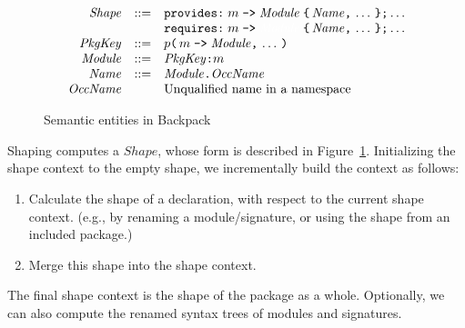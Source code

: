 \documentclass{article}
\newcommand{\I}[1]{\ensuremath{\mathit{#1}}}
\begin{document}
\begin{figure}[htpb]
$$
\begin{array}{rcll}
\I{Shape} & ::= & \verb|provides:|\; m \; \verb|->|\; \I{Module}\; \verb|{|\, \I{Name} \verb|,|\, \ldots \, \verb|};| \ldots \\
      &     & \verb|requires:| \; m \; \verb|->|\; \textcolor{white}{\I{Module}}\; \verb|{| \, \I{Name} \verb|,| \, \ldots \, \verb|}| \verb|;| \ldots \\
\I{PkgKey} & ::= & p \verb|(| \, m \; \verb|->| \; \I{Module} \verb|,|\, \ldots\, \verb|)| \\
\I{Module} & ::= & \I{PkgKey} \verb|:| m \\
\I{Name}   & ::= & \I{Module} \verb|.| \I{OccName} \\
\I{OccName} & & \mbox{Unqualified name in a namespace}
\end{array}
$$
\caption{Semantic entities in Backpack} \label{fig:semantic}
\end{figure}

Shaping computes a \I{Shape}, whose form is described in Figure~\ref{fig:semantic}.
Initializing the shape context to the empty shape, we incrementally
build the context as follows:

\begin{enumerate}
    \item Calculate the shape of a declaration, with respect to the
        current shape context.  (e.g., by renaming a module/signature,
        or using the shape from an included package.)
    \item Merge this shape into the shape context.
\end{enumerate}

The final shape context is the shape of the package as a whole.
Optionally, we can also compute the renamed syntax trees of
modules and signatures.


\end{document}
